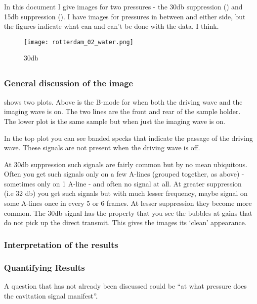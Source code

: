 In this document I give images for two pressures - the 30db suppression () and 15db suppression ().
I have images for pressures in between and either side, but the figures indicate what can and can't be done with the data, I think.


\begin{figure}[h]
     \centering
          \texttt{[image: rotterdam\_02\_water.png]}
     \caption{30db}
   \label{fig:water_cavitation_70}
\end{figure}

\subsection{}
\subsubsection{General discussion of the image}
 shows two plots.
Above is the B-mode for when both the driving wave and the imaging wave is on.
The two lines are the front and rear of the sample holder.
The lower plot is the same sample but when just the imaging wave is on.

In the top plot you can see banded specks that indicate the passage of the driving wave.  
These signals are not present when the driving wave is off. %

At 30db suppression  such signals are fairly common but by no mean ubiquitous.
Often you get such signals only on a few A-lines (grouped together, as above) - sometimes only on 1 A-line - and often no signal at all.
At greater suppression (i.e 32 db) you get such signals but with much lesser frequency, maybe signal on some A-lines once in every 5 or 6 frames.
At lesser suppression they become more common.
The 30db signal has the property that you see  the bubbles at gains that  do not pick up the direct transmit.
This gives the images its `clean' appearance.

\subsubsection{Interpretation of the results}

\subsubsection{Quantifying Results}
A question that has not already been discussed could be  ``at what pressure does the cavitation signal manifest''.

